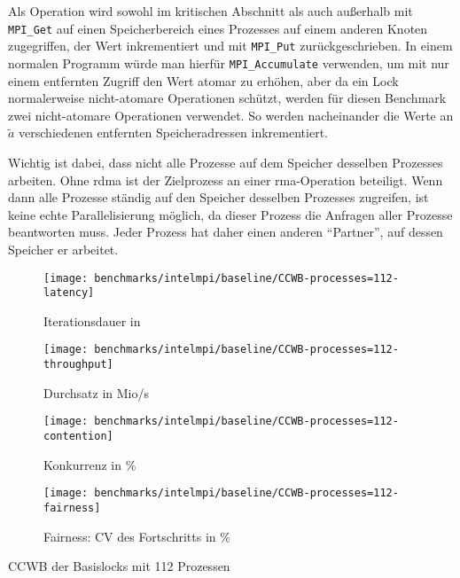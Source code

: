 Als Operation wird sowohl im kritischen Abschnitt
als auch außerhalb mit \texttt{MPI\_Get} auf einen Speicherbereich eines Prozesses auf einem anderen Knoten zugegriffen,
der Wert inkrementiert
und mit \texttt{MPI\_Put} zurückgeschrieben.
In einem normalen Programm würde man hierfür \texttt{MPI\_Accumulate} verwenden,
um mit nur einem entfernten Zugriff den Wert atomar zu erhöhen,
aber da ein Lock normalerweise nicht-atomare Operationen schützt,
werden für diesen Benchmark zwei nicht-atomare Operationen verwendet.
So werden nacheinander die Werte an $\tilde{a}$ verschiedenen entfernten Speicheradressen inkrementiert.

Wichtig ist dabei,
dass nicht alle Prozesse auf dem Speicher desselben Prozesses arbeiten.
Ohne \gls{rdma} ist der Zielprozess an einer \gls{rma}-Operation beteiligt.
Wenn dann alle Prozesse ständig auf den Speicher desselben Prozesses zugreifen,
ist keine echte Parallelisierung möglich,
da dieser Prozess die Anfragen aller Prozesse beantworten muss.
Jeder Prozess hat daher einen anderen \enquote{Partner},
auf dessen Speicher er arbeitet.

\clearpage

\begin{benchmark}[h]
    \begin{subfigure}{.5\textwidth}
        \texttt{[image: benchmarks/intelmpi/baseline/CCWB-processes=112-latency]}
        \caption{Iterationsdauer in }
        \label{ben:baseline_ccwb_112_latency}
    \end{subfigure}
    \begin{subfigure}{.5\textwidth}
        \texttt{[image: benchmarks/intelmpi/baseline/CCWB-processes=112-throughput]}
        \caption{Durchsatz in Mio/s}
        \label{ben:baseline_ccwb_112_throughput}
    \end{subfigure}
    \begin{subfigure}{.5\textwidth}
        \texttt{[image: benchmarks/intelmpi/baseline/CCWB-processes=112-contention]}
        \caption{Konkurrenz in \%}
        \label{ben:baseline_ccwb_112_contention}
    \end{subfigure}
    \begin{subfigure}{.5\textwidth}
        \texttt{[image: benchmarks/intelmpi/baseline/CCWB-processes=112-fairness]}
        \caption{Fairness: CV des Fortschritts in \%}
        \label{ben:baseline_ccwb_112_fairness}
    \end{subfigure}
    \caption{CCWB der Basislocks mit 112 Prozessen}
    \label{ben:baseline_ccwb_112}
\end{benchmark}

